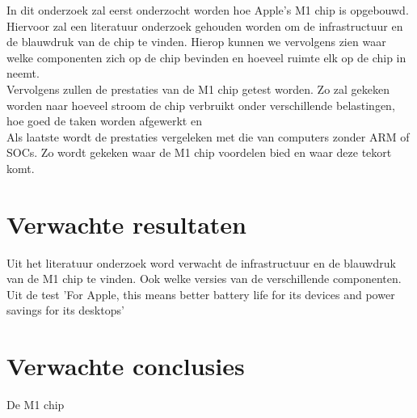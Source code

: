 \documentclass{hogent-article}
\begin{document}
In dit onderzoek zal eerst onderzocht worden hoe Apple's M1 chip is opgebouwd. Hiervoor zal een literatuur onderzoek gehouden worden om de infrastructuur en de blauwdruk van de chip te vinden. Hierop kunnen we vervolgens zien waar welke componenten zich op de chip bevinden en hoeveel ruimte elk op de chip in neemt. \\
Vervolgens zullen de prestaties van de M1 chip getest worden. Zo zal gekeken worden naar hoeveel stroom de chip verbruikt onder verschillende belastingen, hoe goed de taken worden afgewerkt en  \\
Als laatste wordt de prestaties vergeleken met die van computers zonder ARM of SOCs. Zo wordt gekeken waar de M1 chip voordelen bied en waar deze tekort komt.

\section{Verwachte resultaten}

Uit het literatuur onderzoek word verwacht de infrastructuur en de blauwdruk van de M1 chip te vinden. Ook welke versies van de verschillende componenten. \\
Uit de test
'For Apple, this means better battery life for its devices and power savings for its desktops' \autocite{Frazelle2021}




\section{Verwachte conclusies}


De M1 chip


\printbibliography[heading=bibintoc]
\end{document}
